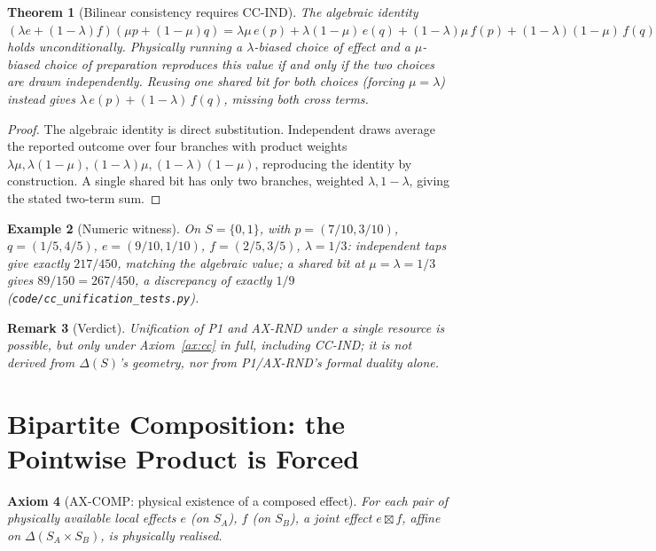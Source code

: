 \documentclass[11pt,a4paper]{article}
\newtheorem{theorem}{Theorem}[section]
\newtheorem{remark}[theorem]{Remark}
\newtheorem{example}[theorem]{Example}
\newtheorem{axiom}[theorem]{Axiom}
\newcommand{\SA}{S_A}
\newcommand{\SB}{S_B}
\begin{document}
    \begin{theorem}[Bilinear consistency requires CC-IND]
      \label{thm:ccu5}
      The algebraic identity $(\lambda e + (1-\lambda)f)(\mu p + (1-\mu)q) = \lambda\mu\, e(p) +
      \lambda(1-\mu)\, e(q) + (1-\lambda)\mu\, f(p) + (1-\lambda)(1-\mu)\, f(q)$ holds unconditionally.
      Physically running a $\lambda$-biased choice of effect and a $\mu$-biased choice of preparation
      reproduces this value \emph{if and only if} the two choices are drawn independently.
      Reusing one shared bit for both choices (forcing $\mu = \lambda$) instead gives
      $\lambda\, e(p) + (1-\lambda)\, f(q)$, missing both cross terms.
    \end{theorem}

    \begin{proof}
      The algebraic identity is direct substitution.
      Independent draws average the reported outcome over four branches with product weights
      $\lambda\mu, \lambda(1-\mu), (1-\lambda)\mu, (1-\lambda)(1-\mu)$, reproducing the identity by
      construction.
      A single shared bit has only two branches, weighted $\lambda, 1-\lambda$, giving the stated two-term
      sum.
    \end{proof}

    \begin{example}[Numeric witness]
      \label{ex:ccu5-numeric}
      On $S = \{0,1\}$, with $p = (7/10, 3/10)$, $q = (1/5, 4/5)$, $e = (9/10, 1/10)$, $f = (2/5, 3/5)$,
      $\lambda = 1/3$: independent taps give exactly $217/450$, matching the algebraic value; a shared bit
      at $\mu = \lambda = 1/3$ gives $89/150 = 267/450$, a discrepancy of exactly $1/9$
      (\texttt{code/cc\_unification\_tests.py}).
    \end{example}

    \begin{remark}[Verdict]
      \label{rem:ccu6}
      Unification of P1 and AX-RND under a single resource is possible, but only under Axiom~\ref{ax:cc} in
      full, including CC-IND; it is not derived from $\Delta(S)$'s geometry, nor from P1/AX-RND's formal
      duality alone.
    \end{remark}

  \section{Bipartite Composition: the Pointwise Product is Forced}
  \label{sec:composition}

    \begin{axiom}[AX-COMP: physical existence of a composed effect]
      \label{ax:comp}
      For each pair of physically available local effects $e$ (on $\SA$), $f$ (on $\SB$), a joint effect
      $e \boxtimes f$, affine on $\Delta(\SA \times \SB)$, is physically realised.
    \end{axiom}
\end{document}
